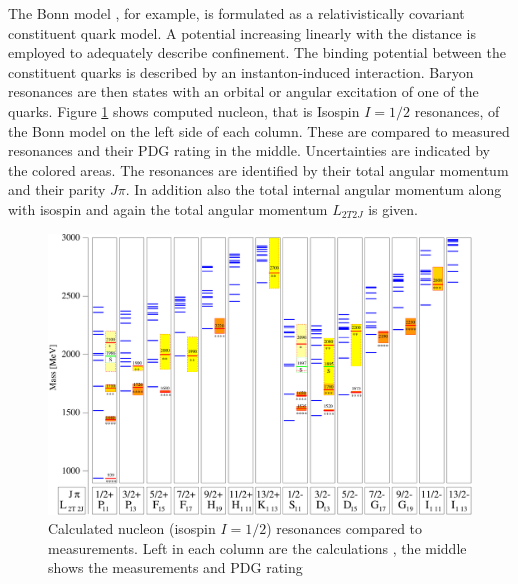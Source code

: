  The Bonn model \cite{bonnmodel}, for example, is formulated as a relativistically covariant constituent quark model.
 A potential increasing linearly with the distance is employed to adequately describe confinement. The binding potential between the constituent quarks is described by an instanton-induced interaction. Baryon resonances are then states with an orbital or angular excitation of one of the quarks. Figure \ref{fig:bm} shows computed nucleon, that is Isospin $I=1/2$ resonances, of the Bonn model \cite{bonnmodel} on the left side of each column. These are compared to measured resonances and their PDG rating \cite{pdg} in the middle. Uncertainties are indicated by the colored areas. The resonances are identified by their total angular momentum and their parity $J\pi$. In addition also the total internal angular momentum along with isospin and again the total angular momentum $L_{2T2J}$ is given.
  \begin{figure}[htbp]
 	\centering
 	\includegraphics[width=\linewidth]{figs/NucM2.pdf}
 	\caption{Calculated nucleon (isospin $I=1/2$) resonances compared to measurements. Left in each column are the calculations \cite{bonnmodel}, the middle shows the measurements and PDG rating \cite{pdg}}
 	\label{fig:bm}
 \end{figure}
